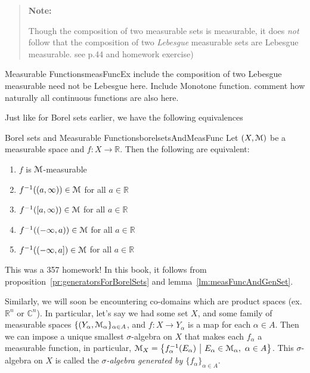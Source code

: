 \documentclass[oneside]{book}
\newenvironment{titledBox}[1] 
 {\begin{tcolorbox}[enhanced, sharp corners, colback=white , borderline={0.2pt}{0pt}{black}]
   \begin{quote}\textbf{#1}
   }{
   \end{quote}\end{tcolorbox}}
\newcommand{\R}{\mathbb{R}}
\renewcommand{\C}{\mathbb{C}}
\newcommand{\MM}{\EuScript{M}}
\newcommand{\set}[2]{\left\{#1 \ \middle|\ #2\right\}}
\newcommand{\rw}{\rightarrow}
\begin{document}
\begin{titledBox}{Note: }
	Though the composition of two measurable sets is measurable, it does \emph{not} follow that the composition of two
	\emph{Lebesgue} measurable sets are Lebesgue measurable. see p.44 and homework exercise)
\end{titledBox}

\begin{example}{Measurable Functions}{measFuncEx}
	include the composition of two Lebesgue measurable need not be Lebesgue here. Include Monotone function. comment how
	naturally all continuous functions are also here. 
\end{example}

Just like for Borel sets earlier, we have the following equivalences

\begin{prop}{Borel sets and Measurable Functions}{borelsetsAndMeasFunc}
	Let $(X, \MM)$ be a measurable space and $f: X \rw \R$. Then the following are equivalent:
	\begin{enumerate}
		\item $f$ is $\MM$-measurable
		\item $f^{-1}((a, \infty))\in \MM$ for all $a \in \R$
		\item $f^{-1}([a, \infty))\in \MM$ for all $a \in \R$
		\item $f^{-1}((-\infty,a))\in \MM$ for all $a \in \R$
		\item $f^{-1}((-\infty,a])\in \MM$ for all $a \in \R$
	\end{enumerate}
\end{prop}

\begin{Proof}
	This was a 357 homework! In this book, it follows from proposition~\ref{pr:generatorsForBorelSets} and
	lemma~\ref{lm:measFuncAndGenSet}. 
\end{Proof}

Similarly, we will soon be encountering co-domains which are product spaces (ex. $\R^n$ or $\C^n$). In particular, let's
say we had some set $X$, and some family of measurable spaces $\{(Y_\alpha, \MM_\alpha\}_{\alpha \in A}$, and $f:
X \rw Y_\alpha$ is a map for each $\alpha \in A$. Then we can impose a unique smallest $\sigma$-algebra on $X$ that
makes each $f_\alpha$ a measurable function, in particular, $\MM_X = \set{f^{-1}_\alpha(E_\alpha)}{E_\alpha \in
\MM_\alpha,\ \alpha \in A}$. This $\sigma$-algebra on $X$ is called the \emph{$\sigma$-algebra generated by
$\{f_\alpha\}_{\alpha \in A}$}. 
\end{document}
